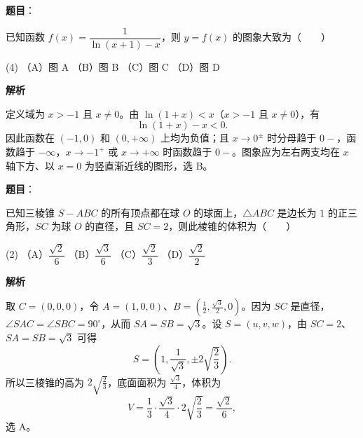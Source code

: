 \begin{answer}

\textbf{题目}：

已知函数 $f(x)=\dfrac{1}{\ln(x+1)-x}$，则 $y=f(x)$ 的图象大致为\mbox{（　　）}
\nopagebreak[4]
\begin{center}\end{center}
\nopagebreak[4]
\begin{gkopts}(4)
\task （A）图 A
\task （B）图 B
\task （C）图 C
\task （D）图 D
\end{gkopts}

\textbf{解析}

定义域为 $x>-1$ 且 $x\ne0$。由 $\ln(1+x)<x$（$x>-1$ 且 $x\ne0$），有
\nopagebreak[4]
\[
\ln(1+x)-x<0.
\]
因此函数在 $(-1,0)$ 和 $(0,+\infty)$ 上均为负值；且 $x\to0^\pm$ 时分母趋于 $0-$，函数趋于 $-\infty$，$x\to-1^+$ 或 $x\to+\infty$ 时函数趋于 $0-$。图象应为左右两支均在 $x$ 轴下方、以 $x=0$ 为竖直渐近线的图形，选 B。


\end{answer}
\begin{answer}

\textbf{题目}：

已知三棱锥 $S-ABC$ 的所有顶点都在球 $O$ 的球面上，$\triangle ABC$ 是边长为 $1$ 的正三角形，$SC$ 为球 $O$ 的直径，且 $SC=2$，则此棱锥的体积为\mbox{（　　）}

\begin{gkopts}(2)
\task （A）$\dfrac{\sqrt2}{6}$
\task （B）$\dfrac{\sqrt3}{6}$
\task （C）$\dfrac{\sqrt2}{3}$
\task （D）$\dfrac{\sqrt2}{2}$
\end{gkopts}

\textbf{解析}

取 $C=(0,0,0)$，令 $A=(1,0,0)$、$B=(\frac12,\frac{\sqrt3}{2},0)$。因为 $SC$ 是直径，$\angle SAC=\angle SBC=90^\circ$，从而 $SA=SB=\sqrt3$。设 $S=(u,v,w)$，由 $SC=2$、$SA=SB=\sqrt3$ 可得
\nopagebreak[4]
\[
S=\left(1,\frac1{\sqrt3},\pm2\sqrt{\frac23}\right).
\]
所以三棱锥的高为 $2\sqrt{\frac23}$，底面面积为 $\frac{\sqrt3}{4}$，体积为
\nopagebreak[4]
\[
V=\frac13\cdot\frac{\sqrt3}{4}\cdot2\sqrt{\frac23}
=\frac{\sqrt2}{6},
\]
选 A。


\end{answer}
